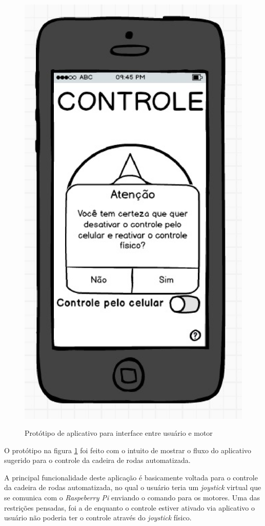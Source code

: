 \begin{figure}[!htb]
{  		\includegraphics[keepaspectratio=true,scale=0.6]{figuras/controle/tela_4}
		}
		\caption{Protótipo de aplicativo para interface entre usuário e motor}
		\label{fig:prototipos}
  \end{figure}

O protótipo na figura \ref{fig:prototipos} foi feito com o intuito de mostrar o fluxo do aplicativo sugerido para o controle da cadeira de rodas automatizada.

A principal funcionalidade deste aplicação é basicamente voltada para o controle da cadeira de rodas automatizada, no qual o usuário teria um \textit{joystick} virtual que se comunica com o \textit{Raspeberry Pi} enviando o comando para os motores.
Uma das restrições pensadas, foi a de enquanto o controle estiver ativado via aplicativo o usuário não poderia ter o controle através do \textit{joystick} físico.
